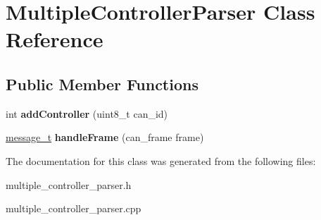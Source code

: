 \hypertarget{classMultipleControllerParser}{}\section{Multiple\+Controller\+Parser Class Reference}
\label{classMultipleControllerParser}
\subsection*{Public Member Functions}
\begin{DoxyCompactItemize}
\item 
int {\bfseries add\+Controller} (uint8\+\_\+t can\+\_\+id)\hypertarget{classMultipleControllerParser_a9f7fc9bcef88ff36f78add7ee5e22fd3}{}\label{classMultipleControllerParser_a9f7fc9bcef88ff36f78add7ee5e22fd3}

\item 
\hyperlink{structMessage}{message\+\_\+t} {\bfseries handle\+Frame} (can\+\_\+frame frame)\hypertarget{classMultipleControllerParser_a8bef539882907a651c6ad1938da9f0e7}{}\label{classMultipleControllerParser_a8bef539882907a651c6ad1938da9f0e7}

\end{DoxyCompactItemize}


The documentation for this class was generated from the following files\+:\begin{DoxyCompactItemize}
\item 
multiple\+\_\+controller\+\_\+parser.\+h\item 
multiple\+\_\+controller\+\_\+parser.\+cpp\end{DoxyCompactItemize}
